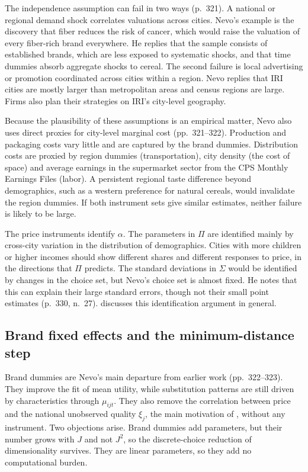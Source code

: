 The independence assumption can fail in two ways (p.~321). A national or regional demand shock correlates
valuations across cities. Nevo's example is the discovery that fiber reduces the risk of cancer, which would
raise the valuation of every fiber-rich brand everywhere. He replies that the sample consists of established
brands, which are less exposed to systematic shocks, and that time dummies absorb aggregate shocks to cereal.
The second failure is local advertising or promotion coordinated across cities within a region. Nevo replies
that IRI cities are mostly larger than metropolitan areas and census regions are large. Firms also plan their
strategies on IRI's city-level geography.

 Because the plausibility of these assumptions is an empirical matter, Nevo also uses
direct proxies for city-level marginal cost (pp.~321--322). Production and packaging costs vary little and are
captured by the brand dummies. Distribution costs are proxied by region dummies (transportation), city density
(the cost of space) and average earnings in the supermarket sector from the CPS Monthly Earnings Files
(labor). A persistent regional taste difference beyond demographics, such as a western preference for natural
cereals, would invalidate the region dummies. If both instrument sets give similar estimates, neither failure
is likely to be large.

 The price instruments identify $\alpha$. The parameters
in $\Pi$ are identified mainly by cross-city variation in the distribution of demographics. Cities with more
children or higher incomes should show different shares and different responses to price, in the directions
that $\Pi$ predicts. The standard deviations in $\Sigma$ would be identified by changes in the choice set, but
Nevo's choice set is almost fixed. He notes that this can explain their large standard errors, though not their
small point estimates (p.~330, n.~27).  discusses this identification argument in
general.

\subsection{Brand fixed effects and the minimum-distance step}\label{sec:08-nevo01-md}

Brand dummies are Nevo's main departure from earlier work (pp.~322--323). They improve the fit of mean utility,
while substitution patterns are still driven by characteristics through $\mu_{ijt}$. They also remove the
correlation between price and the national unobserved quality $\xi_j$, the main motivation of
\citet{Berry1994}, without any instrument. Two objections arise. Brand dummies add parameters, but their number
grows with $J$ and not $J^2$, so the discrete-choice reduction of dimensionality survives. They are linear
parameters, so they add no computational burden.

